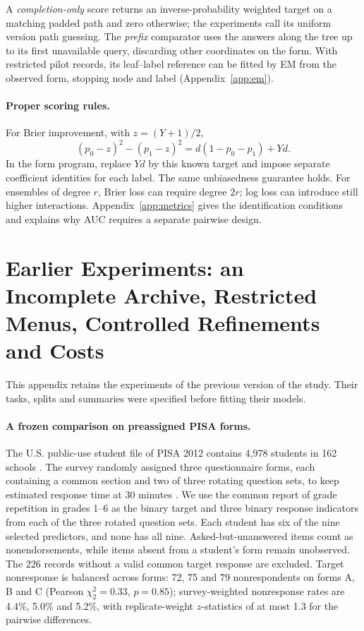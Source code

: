 A \emph{completion-only} score returns an inverse-probability weighted target on a matching padded path and zero otherwise; the experiments call its uniform version path guessing. The \emph{prefix} comparator uses the answers along the tree up to its first unavailable query, discarding other coordinates on the form. With restricted pilot records, its leaf--label reference can be fitted by EM from the observed form, stopping node and label (Appendix~\ref{app:em}).

\paragraph{Proper scoring rules.}
For Brier improvement, with $z=(Y+1)/2$,
\[
 (p_0-z)^2-(p_1-z)^2=d(1-p_0-p_1)+Yd.
\]
In the form program, replace $Yd$ by this known target and impose separate coefficient identities for each label. The same unbiasedness guarantee holds. For ensembles of degree $r$, Brier loss can require degree $2r$; log loss can introduce still higher interactions. Appendix~\ref{app:metrics} gives the identification conditions and explains why AUC requires a separate pairwise design.

\section{Earlier Experiments: an Incomplete Archive, Restricted Menus, Controlled Refinements and Costs}\label{sec:exp}
This appendix retains the experiments of the previous version of the study. Their tasks, splits and summaries were specified before fitting their models.

\paragraph{A frozen comparison on preassigned PISA forms.}
The U.S. public-use student file of PISA 2012 contains 4,978 students in 162 schools \citep{pisaus2014}. The survey randomly assigned three questionnaire forms, each containing a common section and two of three rotating question sets, to keep estimated response time at 30 minutes \citep{pisa2014,kastberg2014}. We use the common report of grade repetition in grades 1--6 as the binary target and three binary response indicators from each of the three rotated question sets. Each student has six of the nine selected predictors, and none has all nine. Asked-but-unanswered items count as nonendorsements, while items absent from a student's form remain unobserved. The 226 records without a valid common target response are excluded. Target nonresponse is balanced across forms: 72, 75 and 79 nonrespondents on forms A, B and C (Pearson $\chi^2_2=0.33$, $p=0.85$); survey-weighted nonresponse rates are 4.4\%, 5.0\% and 5.2\%, with replicate-weight $z$-statistics of at most 1.3 for the pairwise differences.


